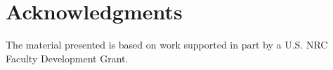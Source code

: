 \documentclass{anstrans}
\begin{document}
\section{Acknowledgments}

The material presented is based on work supported in part by a U.S. NRC Faculty Development Grant. 



\end{document}
